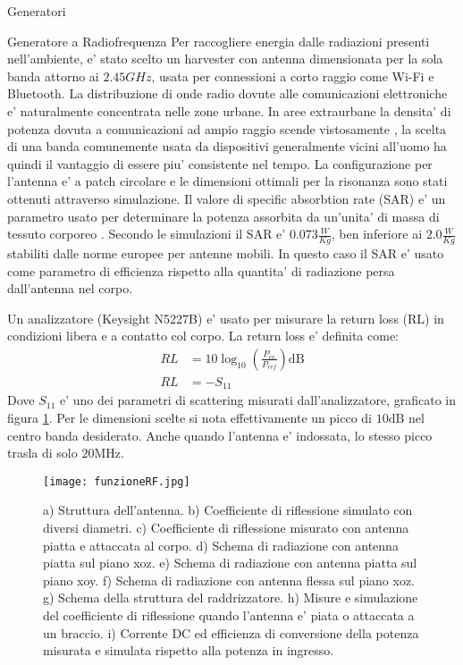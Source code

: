 \begin{section}{Generatori}
    \begin{subsection}{Generatore a Radiofrequenza}
        Per raccogliere energia dalle radiazioni presenti nell'ambiente, e' stato scelto un harvester con antenna dimensionata per la sola banda attorno ai \(2.45GHz\), usata per connessioni a corto raggio come Wi-Fi e Bluetooth. La distribuzione di onde radio dovute alle comunicazioni elettroniche e' naturalmente concentrata nelle zone urbane. In aree extraurbane la densita' di potenza dovuta a comunicazioni ad ampio raggio scende vistosamente \cite{ibrahimRadioFrequencyEnergy2022}, la scelta di una banda comunemente usata da dispositivi generalmente vicini all'uomo ha quindi il vantaggio di essere piu' consistente nel tempo. La configurazione per l'antenna e' a patch circolare e le dimensioni ottimali per la risonanza sono stati ottenuti attraverso simulazione. Il valore di specific absorbtion rate (SAR) e' un parametro usato per determinare la potenza assorbita da un'unita' di massa di tessuto corporeo \cite{vallozzi26LatestDevelopments2016}. Secondo le simulazioni il SAR e' \(0.073\frac{W}{Kg}\), ben inferiore ai \(2.0\frac{W}{Kg}\) stabiliti dalle norme europee per antenne mobili. In questo caso il SAR e' usato come parametro di efficienza rispetto alla quantita' di radiazione persa dall'antenna nel corpo. 


        
        Un analizzatore (Keysight N5227B) e' usato per misurare la return loss (RL) in condizioni libera e a contatto col corpo. 
        La return loss e' definita come:
        \begin{equation*}
            \begin{aligned}
            RL&=10\log_{10}\left( \frac{P_{in}}{P_{ref}} \right) \mathrm{dB}\\
            RL&=-S_{11}
            \end{aligned}
        \end{equation*}
        Dove \(S_{11}\) e' uno dei parametri di scattering misurati dall'analizzatore, graficato in figura \ref{fig:funzioneRF}. Per le dimensioni scelte si nota effettivamente un picco di \(10\mathrm{dB}\) nel centro banda desiderato. Anche quando l'antenna e' indossata, lo stesso picco trasla di solo \(20\mathrm{MHz}\).
        

        \begin{figure}[hbt!]
            \texttt{[image: funzioneRF.jpg]}
            \centering
            \caption{a) Struttura dell'antenna. b) Coefficiente di riflessione simulato con diversi diametri. c) Coefficiente di riflessione misurato con antenna piatta e attaccata al corpo. d) Schema di radiazione con antenna piatta sul piano xoz. e) Schema di radiazione con antenna piatta sul piano xoy. f) Schema di radiazione con antenna flessa sul piano xoz. g) Schema della struttura del raddrizzatore. h) Misure e simulazione del coefficiente di riflessione quando l'antenna e' piata o attaccata a un braccio. i) Corrente DC ed efficienza di conversione della potenza misurata e simulata rispetto alla potenza in ingresso.\cite{kouWearableAllFabricHybrid2024}}
            \label{fig:funzioneRF}
        \end{figure}
        

\end{subsection}
\end{section}
